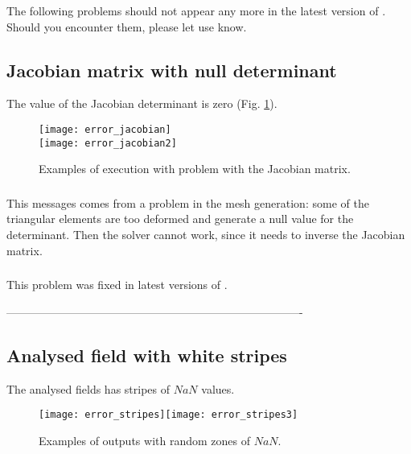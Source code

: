 The following problems should not appear any more in the latest version of \diva. Should you encounter them, please let use know.


\subsection{Jacobian matrix with null determinant}

The value of the Jacobian determinant is zero (Fig. \ref{fig:error_jacobian}).
\begin{figure}[htpb]
\centering
\texttt{[image: error\_jacobian]}\\
\texttt{[image: error\_jacobian2]}
\caption{Examples of \diva execution with problem with the Jacobian matrix. \label{fig:error_jacobian}}
\end{figure}

\subsubsection{\question}

This messages comes from a problem in the mesh generation: some of the triangular elements are too deformed and generate a null value for the determinant. Then the solver cannot work, since it needs to inverse the Jacobian matrix.


\subsubsection{\answer}

This problem was fixed in latest versions of \diva. 

-------------------------------------------------------------------------------

\subsection{Analysed field with white stripes}

The analysed fields has stripes of $NaN$ values.

\begin{figure}[htpb]
\centering
\texttt{[image: error\_stripes]}\texttt{[image: error\_stripes3]}
\caption{Examples of \diva outputs with random zones of $NaN$.\label{fig:error_stripes2}}
\end{figure}

